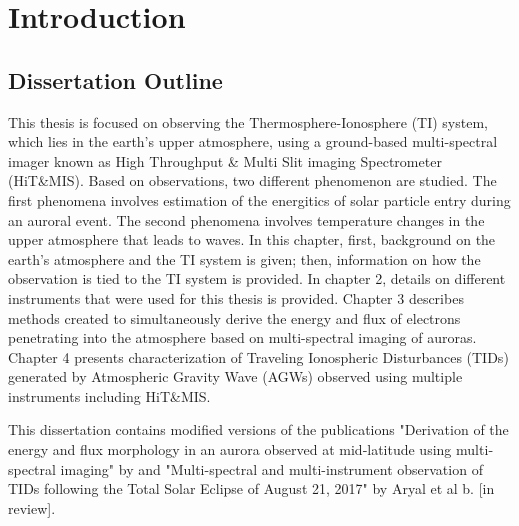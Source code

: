 \chapter{Introduction}
\section{Dissertation Outline}

This thesis is focused on observing the Thermosphere-Ionosphere (TI) system, which lies in the earth's upper atmosphere, using a ground-based multi-spectral imager known as High Throughput \& Multi Slit imaging Spectrometer (HiT\&MIS). Based on observations, two different phenomenon are studied. The first phenomena involves estimation of the energitics of solar particle entry during an auroral event. The second phenomena involves temperature changes in the upper atmosphere that leads to waves. In this chapter, first, background on the earth's atmosphere and the TI system is given; then, information on how the observation is tied to the TI system is provided. In chapter 2, details on different instruments that were used for this thesis is provided. Chapter 3 describes methods created to simultaneously derive the energy and flux of electrons penetrating into the atmosphere based on multi-spectral imaging of auroras. Chapter 4 presents characterization of Traveling Ionospheric Disturbances (TIDs) generated by Atmospheric Gravity Wave (AGWs) observed using multiple instruments including HiT\&MIS.

This dissertation contains modified versions of the publications "Derivation of the energy and flux morphology in an aurora observed at mid‐latitude using multi‐spectral imaging"  by \citep{aryal} and "Multi-spectral and multi-instrument observation of TIDs following the Total Solar Eclipse of August 21, 2017" by Aryal et al b. [in review].


